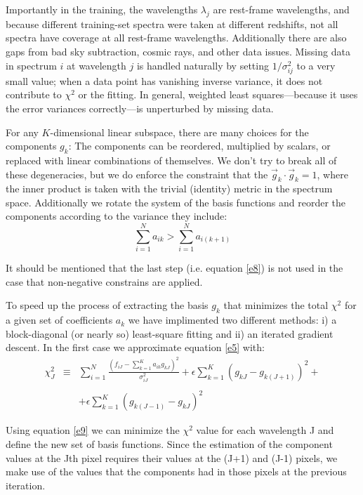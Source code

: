 \documentclass[12pt,preprint]{aastex}
\begin{document}
Importantly in the training, the wavelengths $\lambda_j$ are rest-frame wavelengths, and because different training-set spectra were taken at different redshifts, not all spectra have coverage at all rest-frame wavelengths. Additionally there are also gaps from bad sky subtraction, cosmic rays, and other data issues.  Missing data in spectrum $i$ at wavelength $j$ is handled naturally by setting
$1/\sigma^2_{ij}$ to a very small value; when a data point has vanishing inverse variance, it does not contribute to $\chi^2$ or the fitting. In general, weighted least squares---because it uses the error variances correctly---is unperturbed by missing data.

For any $K$-dimensional linear subspace, there are many choices for the components $g_k$: The components can be reordered, multiplied
by scalars, or replaced with linear combinations of themselves.  We don't try to break all of these degeneracies, but we do enforce the constraint that the $\vec{g}_k\cdot\vec{g}_k=1$, where the inner product is taken with the trivial (identity) metric in the spectrum space. Additionally we rotate the system of the basis functions and reorder the components according to the variance they include:
\begin{equation}\label{e8}
\sum_{i=1}^{N}a_{ik}>\sum_{i=1}^{N}a_{i(k+1)}
\end{equation}

It should be mentioned that the last step (i.e. equation \ref{e8}) is not used in the case that non-negative constrains are applied.

To speed up the process of extracting the basis $g_{k}$ that minimizes the total $\chi^2$ for a given set of coefficients $a_{k}$ we have implimented two different methods: i) a block-diagonal (or nearly so) least-square fitting and ii) an iterated gradient descent. In the first case we approximate equation \ref{e5} with:
\begin{equation}\label{e9}
\begin{array}{rcl}
\chi^2_{J} & \equiv & \sum_{i=1}^{N}\frac{(f_{iJ}-\sum_{k=1}^{K}a_{ik}g_{kJ})^2}{\sigma^2_{iJ}}+\epsilon\sum_{k=1}^{K}(g_{kJ}-g_{k(J+1)})^2+ \\
&&\\
 & & +\epsilon\sum_{k=1}^{K}(g_{k(J-1)}-g_{kJ})^2
\quad 
\end{array}
\end{equation}

Using equation \ref{e9} we can minimize the $\chi^2$ value for each wavelength J and define the new set of basis functions. Since the estimation of the component values at the Jth pixel requires their values at the (J+1) and (J-1) pixels, we make use of the values that the components had in those pixels at the previous iteration.
\end{document}
